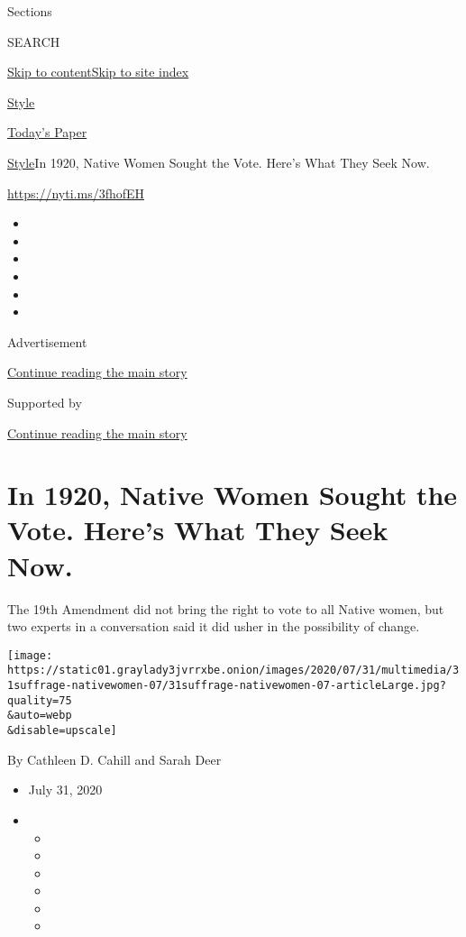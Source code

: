 Sections

SEARCH

\protect\hyperlink{site-content}{Skip to
content}\protect\hyperlink{site-index}{Skip to site index}

\href{https://www.nytimes3xbfgragh.onion/section/style}{Style}

\href{https://myaccount.nytimes3xbfgragh.onion/auth/login?response_type=cookie\&client_id=vi}{}

\href{https://www.nytimes3xbfgragh.onion/section/todayspaper}{Today's
Paper}

\href{/section/style}{Style}\textbar{}In 1920, Native Women Sought the
Vote. Here's What They Seek Now.

\url{https://nyti.ms/3fhofEH}

\begin{itemize}
\item
\item
\item
\item
\item
\item
\end{itemize}

Advertisement

\protect\hyperlink{after-top}{Continue reading the main story}

Supported by

\protect\hyperlink{after-sponsor}{Continue reading the main story}

\hypertarget{in-1920-native-women-sought-the-vote-heres-what-they-seek-now}{%
\section{In 1920, Native Women Sought the Vote. Here's What They Seek
Now.}\label{in-1920-native-women-sought-the-vote-heres-what-they-seek-now}}

The 19th Amendment did not bring the right to vote to all Native women,
but two experts in a conversation said it did usher in the possibility
of change.

\texttt{[image: https://static01.graylady3jvrrxbe.onion/images/2020/07/31/multimedia/31suffrage-nativewomen-07/31suffrage-nativewomen-07-articleLarge.jpg?quality=75\\\&auto=webp\\\&disable=upscale]}

By Cathleen D. Cahill and Sarah Deer

\begin{itemize}
\item
  July 31, 2020
\item
  \begin{itemize}
  \item
  \item
  \item
  \item
  \item
  \item
  \end{itemize}
\end{itemize}

